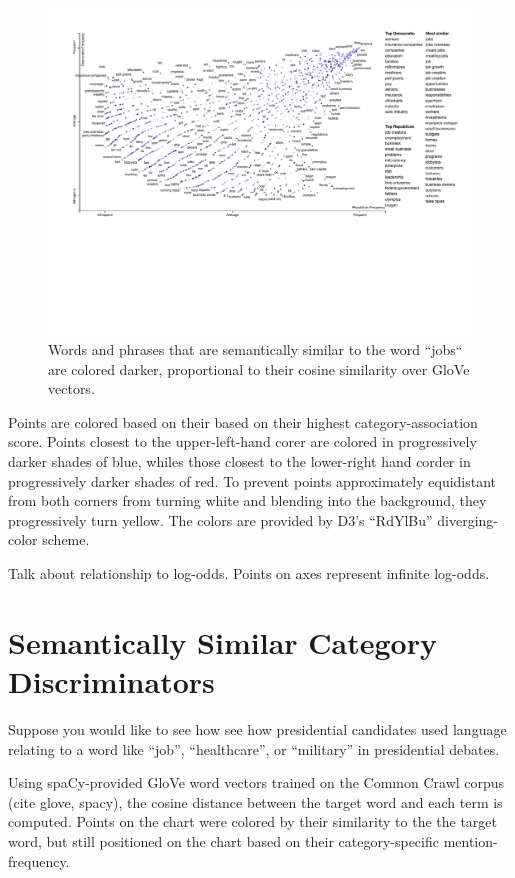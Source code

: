 \documentclass[11pt]{article}
\begin{document}
\begin{figure}[h]
  \includegraphics[width=\linewidth]{similarity_scattertext}
  \caption{Words and phrases that are semantically similar to the word ``jobs`` are colored darker, proportional to their cosine similarity over GloVe vectors.}
\end{figure}


Points are colored based on their based on their highest category-association score.  Points closest to the upper-left-hand corer are colored in progressively darker shades of blue, whiles those closest to the lower-right hand corder in progressively darker shades of red.  To prevent points approximately equidistant from both corners from turning white and blending into the background, they progressively turn yellow.  The colors are provided by D3's ``RdYlBu'' diverging-color scheme. \cite{d3}

Talk about relationship to log-odds.  Points on axes represent infinite log-odds. 

\section{Semantically Similar Category Discriminators}
\label{embeddings}

Suppose you would like to see how see how presidential candidates used language relating to a word like ``job'', ``healthcare'', or ``military'' in presidential debates.  

Using spaCy-provided GloVe \cite{glove} word vectors trained on the Common Crawl corpus (cite glove, spacy), the cosine distance between the target word and each term is computed.  Points on the chart were colored by their similarity to the the target word, but still positioned on the chart based on their category-specific mention-frequency.
\end{document}
